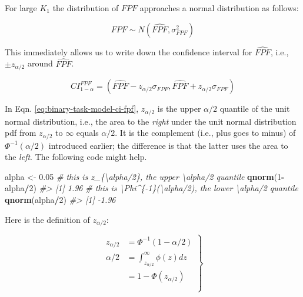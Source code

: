 \documentclass[
]{book}
\newenvironment{Shaded}{\begin{snugshade}}{\end{snugshade}}
\newcommand{\CommentTok}[1]{\textcolor[rgb]{0.56,0.35,0.01}{\textit{#1}}}
\newcommand{\DecValTok}[1]{\textcolor[rgb]{0.00,0.00,0.81}{#1}}
\newcommand{\FloatTok}[1]{\textcolor[rgb]{0.00,0.00,0.81}{#1}}
\newcommand{\KeywordTok}[1]{\textcolor[rgb]{0.13,0.29,0.53}{\textbf{#1}}}
\newcommand{\NormalTok}[1]{#1}
\newcommand{\OperatorTok}[1]{\textcolor[rgb]{0.81,0.36,0.00}{\textbf{#1}}}
\newcommand{\StringTok}[1]{\textcolor[rgb]{0.31,0.60,0.02}{#1}}
\begin{document}
For large \(K_1\) the distribution of \(FPF\) approaches a normal distribution as follows:

\[FPF \sim N\left ( \widehat{FPF}, \sigma_{FPF}^2 \right )\]

This immediately allows us to write down the confidence interval for \(\widehat{FPF}\), i.e., \(\pm z_{\alpha/2}\) around \(\widehat{FPF}\).

\begin{equation} 
CI_{1-\alpha}^{FPF}=\left ( \widehat{FPF} - z_{\alpha/2} \sigma_{FPF}, \widehat{FPF} + z_{\alpha/2} \sigma_{FPF} \right )
\label{eq:binary-task-model-ci-fpf}
\end{equation}

In Eqn. \eqref{eq:binary-task-model-ci-fpf}, \(z_{\alpha/2}\) is the upper \(\alpha/2\) quantile of the unit normal distribution, i.e., the area to the \emph{right} under the unit normal distribution pdf from \(z_{\alpha/2}\) to \(\infty\) equals \(\alpha/2\). It is the complement (i.e., plus goes to minus) of \(\Phi^{-1}(\alpha/2)\) introduced earlier; the difference is that the latter uses the area to the \emph{left}. The following code might help.

\begin{Shaded}
\begin{Highlighting}[]
\NormalTok{alpha <-}\StringTok{ }\FloatTok{0.05}
\CommentTok{# this is z_\{\textbackslash{}alpha/2\}, the upper \textbackslash{}alpha/2 quantile}
\KeywordTok{qnorm}\NormalTok{(}\DecValTok{1}\OperatorTok{-}\NormalTok{alpha}\OperatorTok{/}\DecValTok{2}\NormalTok{) }
\CommentTok{#> [1] 1.96}
\CommentTok{# this is \textbackslash{}Phi^\{-1\}(\textbackslash{}alpha/2), the lower \textbackslash{}alpha/2 quantile}
\KeywordTok{qnorm}\NormalTok{(alpha}\OperatorTok{/}\DecValTok{2}\NormalTok{)   }
\CommentTok{#> [1] -1.96}
\end{Highlighting}
\end{Shaded}

Here is the definition of \(z_{\alpha/2}\):

\begin{equation} 
\left.
\begin{aligned} 
z_{\alpha/2} &=\Phi^{-1}\left ( 1-\alpha/2 \right )\\
\alpha/2&=\int_{z_{\alpha/2}}^{\infty}\phi(z)dz\\ 
&= 1-\Phi(z_{\alpha/2})\\
\\
\end{aligned}
\right \} 
\label{eq:binary-task-model-def-z-alpha2}
\end{equation}
\end{document}
